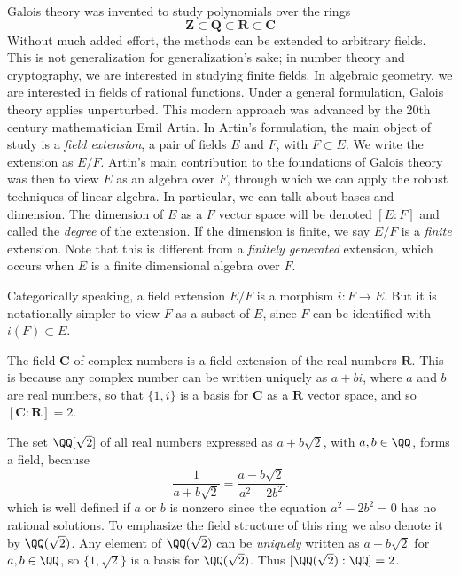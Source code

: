Galois theory was invented to study polynomials over the rings
%
\[ \mathbf{Z} \subset \mathbf{Q} \subset \mathbf{R} \subset \mathbf{C} \]
%
Without much added effort, the methods can be extended to arbitrary fields. This is not generalization for generalization's sake; in number theory and cryptography, we are interested in studying finite fields. In algebraic geometry, we are interested in fields of rational functions. Under a general formulation, Galois theory applies unperturbed. This modern approach was advanced by the 20th century mathematician Emil Artin. In Artin's formulation, the main object of study is a {\it field extension}, a pair of fields $E$ and $F$, with $F \subset E$. We write the extension as $E/F$. Artin's main contribution to the foundations of Galois theory was then to view $E$ as an algebra over $F$, through which we can apply the robust techniques of linear algebra. In particular, we can talk about bases and dimension. The dimension of $E$ as a $F$ vector space will be denoted $[E:F]$ and called the \emph{degree} of the extension. If the dimension is finite, we say $E/F$ is a {\it finite} extension. Note that this is different from a {\it finitely generated} extension, which occurs when $E$ is a finite dimensional algebra over $F$.

\begin{remark}
	Categorically speaking, a field extension $E/F$ is a morphism $i: F \to E$. But it is notationally simpler to view $F$ as a subset of $E$, since $F$ can be identified with $i(F) \subset E$.
\end{remark}

\begin{example}
    The field $\mathbf{C}$ of complex numbers is a field extension of the real numbers $\mathbf{R}$. This is because any complex number can be written uniquely as $a + bi$, where $a$ and $b$ are real numbers, so that $\{ 1, i \}$ is a basis for $\mathbf{C}$ as a $\mathbf{R}$ vector space, and so $[\mathbf{C}: \mathbf{R}] = 2$.
\end{example}

\begin{example}
	The set $\QQ[\sqrt{2}]$ of all real numbers expressed as $a + b \sqrt{2}$, with $a,b \in \QQ$, forms a field, because
	\[ \frac{1}{a + b \sqrt{2}} = \frac{a - b \sqrt{2}}{a^2 - 2b^2}. \]
	which is well defined if $a$ or $b$ is nonzero since the equation $a^2 - 2b^2 = 0$ has no rational solutions. To emphasize the field structure of this ring we also denote it by $\QQ(\sqrt{2})$. Any element of $\QQ(\sqrt{2})$ can be \emph{uniquely} written as $a + b \sqrt{2}$ for $a,b \in \QQ$, so $\{ 1, \sqrt{2} \}$ is a basis for $\QQ(\sqrt{2})$. Thus $[\QQ(\sqrt{2}): \QQ] = 2$.
\end{example}

